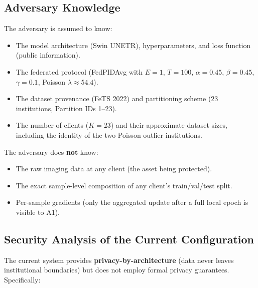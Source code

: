 \documentclass{article}
\begin{document}
\subsection{Adversary Knowledge}

The adversary is assumed to know:

\begin{itemize}
    \item The model architecture (Swin UNETR), hyperparameters, and loss function (public information).
    \item The federated protocol (FedPIDAvg with $E = 1$, $T = 100$, $\alpha=0.45$, $\beta=0.45$, $\gamma=0.1$, Poisson $\lambda \approx 54.4$).
    \item The dataset provenance (FeTS 2022) and partitioning scheme (23 institutions, Partition IDs 1--23).
    \item The number of clients ($K=23$) and their approximate dataset sizes, including the identity of the two Poisson outlier institutions.
\end{itemize}

The adversary does \textbf{not} know:

\begin{itemize}
    \item The raw imaging data at any client (the asset being protected).
    \item The exact sample-level composition of any client's train/val/test split.
    \item Per-sample gradients (only the aggregated update after a full local epoch is visible to A1).
\end{itemize}

\subsection{Security Analysis of the Current Configuration}

The current system provides \textbf{privacy-by-architecture} (data never leaves institutional boundaries) but does not employ formal privacy guarantees. Specifically:
\end{document}
